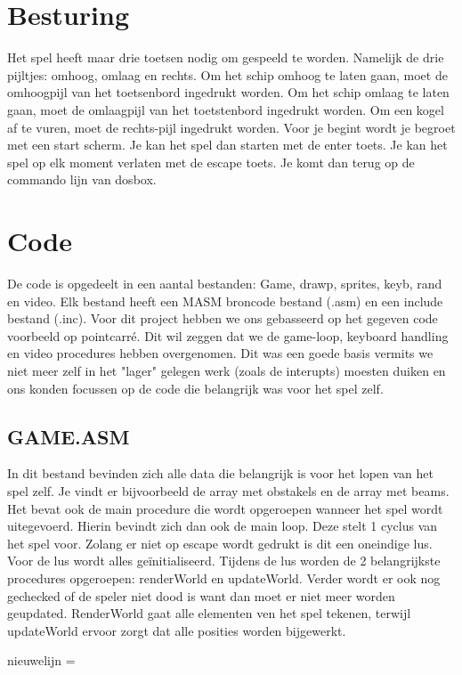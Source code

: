 \documentclass{article}
\begin{document}
\section{Besturing}

Het spel heeft maar drie toetsen nodig om gespeeld te worden. Namelijk de drie pijltjes: omhoog, omlaag en rechts.
Om het schip omhoog te laten gaan, moet de omhoogpijl van het toetsenbord ingedrukt worden.
Om het schip omlaag te laten gaan, moet de omlaagpijl van het toetstenbord ingedrukt worden.
Om een kogel af te vuren, moet de rechts-pijl ingedrukt worden.
Voor je begint wordt je begroet met een start scherm. Je kan het spel dan starten met de enter toets. 
Je kan het spel op elk moment verlaten met de escape toets. Je komt dan terug op de commando lijn van dosbox.

\section{Code}
De code is opgedeelt in een aantal bestanden: Game, drawp, sprites, keyb, rand en video. Elk bestand heeft een MASM broncode bestand (.asm) en een include bestand (.inc).
Voor dit project hebben we ons gebasseerd op het gegeven code voorbeeld op pointcarré. Dit wil zeggen dat we de game-loop, keyboard handling en video procedures hebben overgenomen. 
Dit was een goede basis vermits we niet meer zelf in het "lager" gelegen werk (zoals de interupts) moesten duiken en ons konden focussen op de code die belangrijk was voor het spel zelf.

\subsection{GAME.ASM}
In dit bestand bevinden zich alle data die belangrijk is voor het lopen van het spel zelf. Je vindt er bijvoorbeeld de array met obstakels en de array met beams.
Het bevat ook de main procedure die wordt opgeroepen wanneer het spel wordt uitegevoerd. Hierin bevindt zich dan ook de main loop. Deze stelt 1 cyclus van het spel voor.
Zolang er niet op escape wordt gedrukt is dit een oneindige lus. Voor de lus wordt alles geïnitialiseerd. Tijdens de lus worden de 2 belangrijkste procedures opgeroepen: renderWorld en updateWorld. 
Verder wordt er ook nog gechecked of de speler niet dood is want dan moet er niet meer worden geupdated.
RenderWorld gaat alle elementen ven het spel tekenen, terwijl updateWorld ervoor zorgt dat alle posities worden bijgewerkt. 

nieuwelijn = \\
\end{document}
